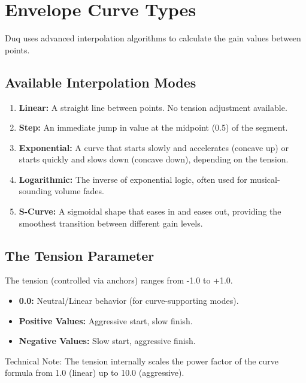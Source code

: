 \chapter{Envelope Curve Types}
\label{ch:curve_types}

Duq uses advanced interpolation algorithms to calculate the gain values between points.

\section{Available Interpolation Modes}
\begin{enumerate}
    \item \textbf{Linear:} A straight line between points. No tension adjustment available.
    \item \textbf{Step:} An immediate jump in value at the midpoint (0.5) of the segment.
    \item \textbf{Exponential:} A curve that starts slowly and accelerates (concave up) or starts quickly and slows down (concave down), depending on the tension.
    \item \textbf{Logarithmic:} The inverse of exponential logic, often used for musical-sounding volume fades.
    \item \textbf{S-Curve:} A sigmoidal shape that eases in and eases out, providing the smoothest transition between different gain levels.
\end{enumerate}

\section{The Tension Parameter}
The tension (controlled via anchors) ranges from -1.0 to +1.0. 
\begin{itemize}
    \item \textbf{0.0:} Neutral/Linear behavior (for curve-supporting modes).
    \item \textbf{Positive Values:} Aggressive start, slow finish.
    \item \textbf{Negative Values:} Slow start, aggressive finish.
\end{itemize}
Technical Note: The tension internally scales the power factor of the curve formula from 1.0 (linear) up to 10.0 (aggressive).
